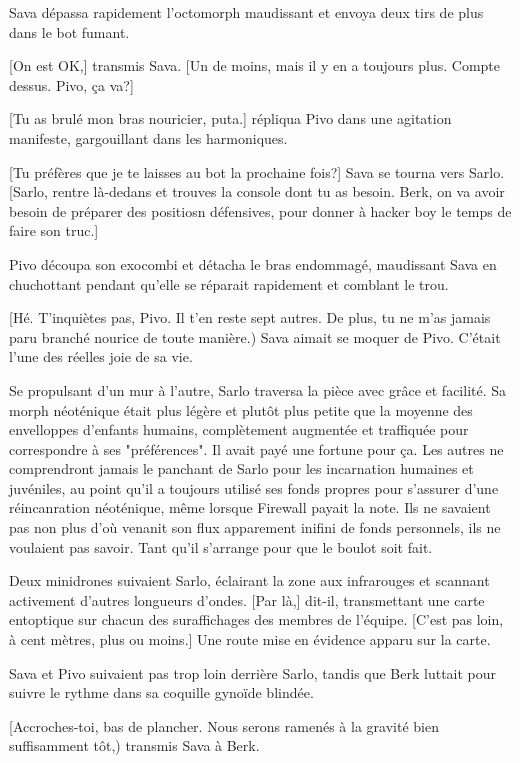 Sava dépassa rapidement l'octomorph maudissant et envoya deux tirs de plus dans le bot fumant. 

[On est OK,] transmis Sava. [Un de moins, mais il y en a toujours plus. Compte dessus. Pivo, ça va?] 

[Tu as brulé mon bras nouricier, puta.] répliqua Pivo dans une agitation manifeste, gargouillant dans les harmoniques. 

[Tu préfères que je te laisses au bot la prochaine fois?] Sava se tourna vers Sarlo. [Sarlo, rentre là-dedans et trouves la console dont tu as besoin. Berk, on va avoir besoin de préparer des positiosn défensives, pour donner à hacker boy le temps de faire son truc.] 

Pivo découpa son exocombi et détacha le bras endommagé, maudissant Sava en chuchottant pendant qu'elle se réparait rapidement et comblant le trou. 

[Hé. T'inquiètes pas, Pivo. Il t'en reste sept autres. De plus, tu ne m'as jamais paru branché nourice de toute manière.) Sava aimait se moquer de Pivo. C'était l'une des réelles joie de sa vie. 

Se propulsant d'un mur à l'autre, Sarlo traversa la pièce avec grâce et facilité. Sa morph néoténique était plus légère et plutôt plus petite que la moyenne des envelloppes d'enfants humains, complètement augmentée et traffiquée pour correspondre à ses "préférences". Il avait payé une fortune pour ça. Les autres ne comprendront jamais le panchant de Sarlo pour les incarnation humaines et juvéniles, au point qu'il a toujours utilisé ses fonds propres pour s'assurer d'une réincanration néoténique, même lorsque Firewall payait la note. Ils ne savaient pas non plus d'où venanit son flux apparement inifini de fonds personnels, ils ne voulaient pas savoir. Tant qu'il s'arrange pour que le boulot soit fait. 

Deux minidrones suivaient Sarlo, éclairant la zone aux infrarouges et scannant activement d'autres longueurs d'ondes. [Par là,] dit-il, transmettant une carte entoptique sur chacun des suraffichages des membres de l'équipe. [C'est pas loin, à cent mètres, plus ou moins.] Une route mise en évidence apparu sur la carte. 

Sava et Pivo suivaient pas trop loin derrière Sarlo, tandis que Berk luttait pour suivre le rythme dans sa coquille gynoïde blindée. 

[Accroches-toi, bas de plancher. Nous serons ramenés à la gravité bien suffisamment tôt,) transmis Sava à Berk. 

